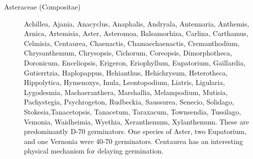 \begin{description}
\item[Asteraceae (Compositae)] Achillea, Ajania, Anacyclus, Anaphalis,
Andryala, Antennaria, Anthemis, Arnica, Artemisia, Aster, Asteromoa, Balsamorhiza,
Carlina, Carthamus, Celmisia, Centaurea, Chaenactis, Chamaechaenactis,
Cremanthodium, Chrysanthemum, Chrysopsis, Cichorum, Coreopsis, Dimorphotheca,
Doronicum, Enceliopsis, Erigeron, Eriophyllum, Eupatorium, Gaillardia, Gutierrtzia,
Haplopappus, Hehianthus, Hehichrysum, Heterotheca, Hippolytica, Hymenoxys, Inula,
Leontopodium, Liatris, Ligularia, Lygodesmia, Machaeranthera, Marshallia,
Melampodium, Mutisia, Pachystegia, Psychrogeton, Rudbeckia, Saussurea, Senecio,
Solidago, Stokesia,Tanacetopsis, Tanacetum, Taraxacum, Townsendia, Tussilago,
Vemonia, Waidheimia, Wyethia, Xeranthemum, Xylanthemum. These are
predominantly D-70 germinators. One species of Aster, two Eupatorium, and one
Vernonia were 40-70 germinators. Centaurea has an interesting physical mechanism
for delaying germination.


\end{description}
